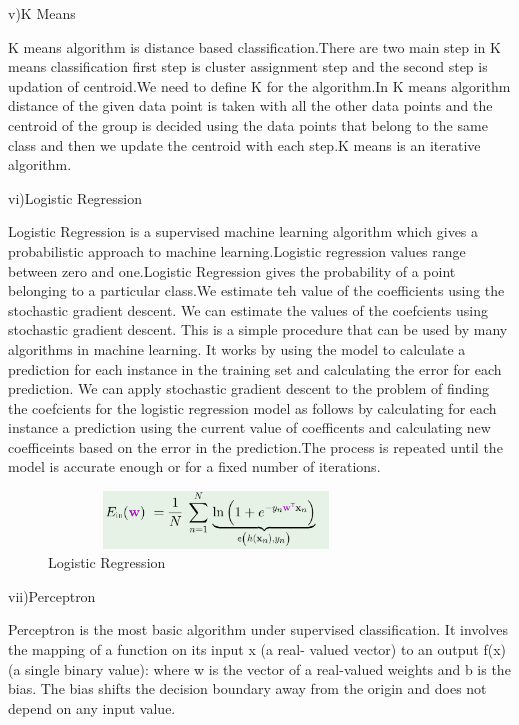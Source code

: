 \documentclass[conference,compsoc]{IEEEtran}
\begin{document}
v)K Means

\newline
K means algorithm is  distance based classification.There are two main step in K means classification first step is cluster assignment step and the second step is updation of centroid.We need to define K for the algorithm.In K means algorithm distance of the given data point is taken with all the other data points and the centroid of the group is decided using the data points that belong to the same class and then we update the centroid with each step.K means is an iterative algorithm.



\newline
vi)Logistic Regression

\newline
Logistic Regression is a supervised machine learning algorithm which gives a probabilistic approach to machine learning.Logistic regression values range between zero and one.Logistic Regression gives the probability of a point belonging to a particular class.We estimate teh value of the coefficients using the stochastic gradient descent.
We can estimate the values of the coefcients using stochastic gradient descent. This is a simple procedure that can be used by many algorithms in machine learning. It works by using the model to calculate a prediction for each instance in the training set and calculating the error for each prediction. We can apply stochastic gradient descent to the problem of finding the coefcients for the logistic regression model as follows by calculating for each instance a prediction using the current value of coefficents and calculating new coefficeints based on the error in the prediction.The process is repeated until the model is accurate enough or for a fixed number of iterations.
\begin{figure}[H]
\centering
\includegraphics[width=3.5in,height=0.6in]{lr1.png}
\caption{Logistic Regression}
\label{fig_error}

\end{figure}  

\newline
vii)Perceptron
\newline
\par
Perceptron is the most basic algorithm under supervised classification. It involves the mapping of a function on its input x (a real- valued vector) to an output f(x) (a single binary value):
where w is the vector of a real-valued weights and b is the bias.
The bias shifts the decision boundary away from the origin and does not depend on any input value.
\end{document}
